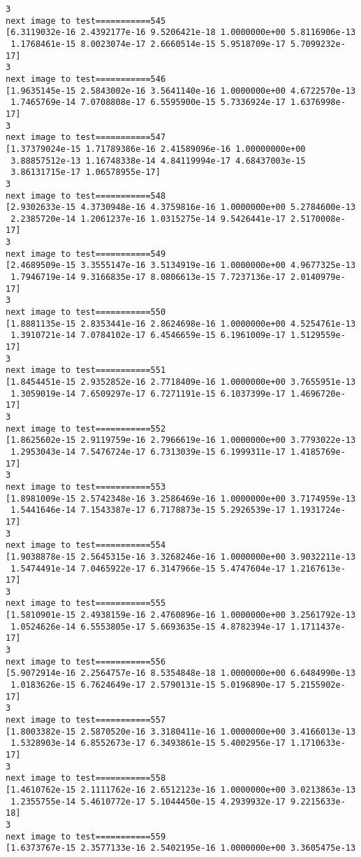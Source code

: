 \documentclass[11pt]{article}
\begin{document}
\begin{Verbatim}[commandchars=\\\{\}]
3
next image to test===========545
[6.3119032e-16 2.4392177e-16 9.5206421e-18 1.0000000e+00 5.8116906e-13
 1.1768461e-15 8.0023074e-17 2.6660514e-15 5.9518709e-17 5.7099232e-17]
3
next image to test===========546
[1.9635145e-15 2.5843002e-16 3.5641140e-16 1.0000000e+00 4.6722570e-13
 1.7465769e-14 7.0708808e-17 6.5595900e-15 5.7336924e-17 1.6376998e-17]
3
next image to test===========547
[1.37379024e-15 1.71789386e-16 2.41589096e-16 1.00000000e+00
 3.88857512e-13 1.16748338e-14 4.84119994e-17 4.68437003e-15
 3.86131715e-17 1.06578955e-17]
3
next image to test===========548
[2.9302633e-15 4.3730948e-16 4.3759816e-16 1.0000000e+00 5.2784600e-13
 2.2385720e-14 1.2061237e-16 1.0315275e-14 9.5426441e-17 2.5170008e-17]
3
next image to test===========549
[2.4689509e-15 3.3555147e-16 3.5134919e-16 1.0000000e+00 4.9677325e-13
 1.7946719e-14 9.3166835e-17 8.0806613e-15 7.7237136e-17 2.0140979e-17]
3
next image to test===========550
[1.8881135e-15 2.8353441e-16 2.8624698e-16 1.0000000e+00 4.5254761e-13
 1.3910721e-14 7.0784102e-17 6.4546659e-15 6.1961009e-17 1.5129559e-17]
3
next image to test===========551
[1.8454451e-15 2.9352852e-16 2.7718409e-16 1.0000000e+00 3.7655951e-13
 1.3059019e-14 7.6509297e-17 6.7271191e-15 6.1037399e-17 1.4696720e-17]
3
next image to test===========552
[1.8625602e-15 2.9119759e-16 2.7966619e-16 1.0000000e+00 3.7793022e-13
 1.2953043e-14 7.5476724e-17 6.7313039e-15 6.1999311e-17 1.4185769e-17]
3
next image to test===========553
[1.8981009e-15 2.5742348e-16 3.2586469e-16 1.0000000e+00 3.7174959e-13
 1.5441646e-14 7.1543387e-17 6.7178873e-15 5.2926539e-17 1.1931724e-17]
3
next image to test===========554
[1.9038878e-15 2.5645315e-16 3.3268246e-16 1.0000000e+00 3.9032211e-13
 1.5474491e-14 7.0465922e-17 6.3147966e-15 5.4747604e-17 1.2167613e-17]
3
next image to test===========555
[1.5810901e-15 2.4938159e-16 2.4760896e-16 1.0000000e+00 3.2561792e-13
 1.0524626e-14 6.5553805e-17 5.6693635e-15 4.8782394e-17 1.1711437e-17]
3
next image to test===========556
[5.9072914e-16 2.2564757e-16 8.5354848e-18 1.0000000e+00 6.6484990e-13
 1.0183626e-15 6.7624649e-17 2.5790131e-15 5.0196890e-17 5.2155902e-17]
3
next image to test===========557
[1.8003382e-15 2.5870520e-16 3.3180411e-16 1.0000000e+00 3.4166013e-13
 1.5328903e-14 6.8552673e-17 6.3493861e-15 5.4002956e-17 1.1710633e-17]
3
next image to test===========558
[1.4610762e-15 2.1111762e-16 2.6512123e-16 1.0000000e+00 3.0213863e-13
 1.2355755e-14 5.4610772e-17 5.1044450e-15 4.2939932e-17 9.2215633e-18]
3
next image to test===========559
[1.6373767e-15 2.3577133e-16 2.5402195e-16 1.0000000e+00 3.3605475e-13

\end{Verbatim}
\end{document}
